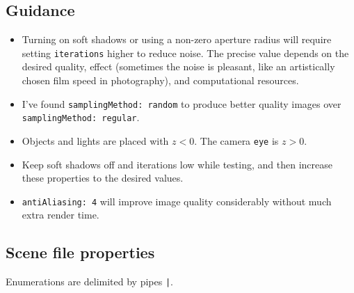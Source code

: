 \documentclass{article}
\begin{document}
\subsection{Guidance}

\begin{itemize}
    \item Turning on soft shadows or using a non-zero aperture radius will require setting \texttt{iterations} higher to reduce noise. The precise value depends on the desired quality, effect (sometimes the noise is pleasant, like an artistically chosen film speed in photography), and computational resources.
    \item I've found \texttt{samplingMethod: random} to produce better quality images over \texttt{samplingMethod: regular}.
    \item Objects and lights are placed with $z < 0$. The camera \texttt{eye} is $z > 0$.
    \item Keep soft shadows off and iterations low while testing, and then increase these properties to the desired values.
    \item \texttt{antiAliasing: 4} will improve image quality considerably without much extra render time.
\end{itemize}

\pagebreak

\subsection{Scene file properties}

Enumerations are delimited by pipes \texttt{|}.\\\\
\end{document}
